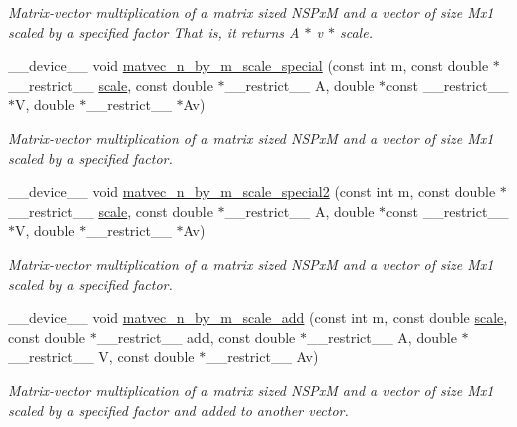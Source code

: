 \begin{DoxyCompactItemize}
\begin{DoxyCompactList}\small\item\em Matrix-\/vector multiplication of a matrix sized N\+S\+PxM and a vector of size Mx1 scaled by a specified factor That is, it returns A $\ast$ v $\ast$ scale. \end{DoxyCompactList}\item 
\+\_\+\+\_\+device\+\_\+\+\_\+ void \hyperlink{exponential__linear__algebra_8cuh_aafe924c72a847b1d591e8fecb0efebdc}{matvec\+\_\+n\+\_\+by\+\_\+m\+\_\+scale\+\_\+special} (const int m, const double $\ast$\+\_\+\+\_\+restrict\+\_\+\+\_\+ \hyperlink{inverse_8cu_adbb4f3f3af5f968a94f717729803c88d}{scale}, const double $\ast$\+\_\+\+\_\+restrict\+\_\+\+\_\+ A, double $\ast$const \+\_\+\+\_\+restrict\+\_\+\+\_\+ $\ast$V, double $\ast$\+\_\+\+\_\+restrict\+\_\+\+\_\+ $\ast$Av)
\begin{DoxyCompactList}\small\item\em Matrix-\/vector multiplication of a matrix sized N\+S\+PxM and a vector of size Mx1 scaled by a specified factor. \end{DoxyCompactList}\item 
\+\_\+\+\_\+device\+\_\+\+\_\+ void \hyperlink{exponential__linear__algebra_8cuh_a6d511f330da8ea1a044ed327a132d290}{matvec\+\_\+n\+\_\+by\+\_\+m\+\_\+scale\+\_\+special2} (const int m, const double $\ast$\+\_\+\+\_\+restrict\+\_\+\+\_\+ \hyperlink{inverse_8cu_adbb4f3f3af5f968a94f717729803c88d}{scale}, const double $\ast$\+\_\+\+\_\+restrict\+\_\+\+\_\+ A, double $\ast$const \+\_\+\+\_\+restrict\+\_\+\+\_\+ $\ast$V, double $\ast$\+\_\+\+\_\+restrict\+\_\+\+\_\+ $\ast$Av)
\begin{DoxyCompactList}\small\item\em Matrix-\/vector multiplication of a matrix sized N\+S\+PxM and a vector of size Mx1 scaled by a specified factor. \end{DoxyCompactList}\item 
\+\_\+\+\_\+device\+\_\+\+\_\+ void \hyperlink{exponential__linear__algebra_8cuh_a28166d4c2569ab108219b8466bef8a77}{matvec\+\_\+n\+\_\+by\+\_\+m\+\_\+scale\+\_\+add} (const int m, const double \hyperlink{inverse_8cu_adbb4f3f3af5f968a94f717729803c88d}{scale}, const double $\ast$\+\_\+\+\_\+restrict\+\_\+\+\_\+ add, const double $\ast$\+\_\+\+\_\+restrict\+\_\+\+\_\+ A, double $\ast$\+\_\+\+\_\+restrict\+\_\+\+\_\+ V, const double $\ast$\+\_\+\+\_\+restrict\+\_\+\+\_\+ Av)
\begin{DoxyCompactList}\small\item\em Matrix-\/vector multiplication of a matrix sized N\+S\+PxM and a vector of size Mx1 scaled by a specified factor and added to another vector. \end{DoxyCompactList}\item 

\end{DoxyCompactItemize}
